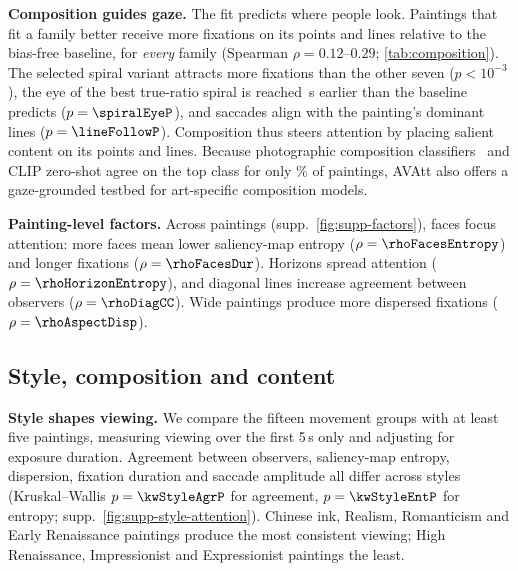 \documentclass[10pt,twocolumn,letterpaper]{article}
\newcommand{\avatt}{AVAtt}
\newcommand{\mypara}[1]{\vspace{2pt}\noindent\textbf{#1}\hspace{0.5em}}
\begin{document}
\mypara{Composition guides gaze.} The fit predicts where people look. Paintings that fit a family better receive more
fixations on its points and lines relative to the bias-free baseline, for \emph{every} family (Spearman
$\rho=0.12$--$0.29$; \cref{tab:composition}). The selected spiral variant attracts more fixations than the other seven
($p<10^{-3}$), the eye of the best true-ratio spiral is reached \spiralEyeGain\,s earlier than the baseline predicts
($p=\spiralEyeP$), and saccades align with the painting's dominant lines ($p=\lineFollowP$). Composition thus steers
attention by placing salient content on its points and lines. Because photographic composition
classifiers~\cite{hong2021cacnet,lee2018kupcp} and CLIP zero-shot agree on the top class for only \cacClipAgree\% of
paintings, \avatt{} also offers a gaze-grounded testbed for art-specific composition models.

\begin{table}[t]
  \centering
  \caption{Composition families. Var.: variants; Top / Bottom: fixation enrichment on the template (observed /
  baseline) for the best- and worst-fitting quarter of paintings; $\rho$: correlation between image-only fit and
  enrichment.}
  \label{tab:composition}
\end{table}

\mypara{Painting-level factors.} Across paintings (supp.\ \cref{fig:supp-factors}), faces focus attention: more faces
mean lower saliency-map entropy ($\rho=\rhoFacesEntropy$) and longer fixations ($\rho=\rhoFacesDur$). Horizons spread
attention ($\rho=\rhoHorizonEntropy$), and diagonal lines increase agreement between observers ($\rho=\rhoDiagCC$).
Wide paintings produce more dispersed fixations ($\rho=\rhoAspectDisp$).

\subsection{Style, composition and content}
\label{sec:style}

\mypara{Style shapes viewing.} We compare the fifteen movement groups with at least five paintings, measuring viewing
over the first 5\,s only and adjusting for exposure duration. Agreement between observers, saliency-map entropy,
dispersion, fixation duration and saccade amplitude all differ across styles (Kruskal--Wallis $p=\kwStyleAgrP$ for
agreement, $p=\kwStyleEntP$ for entropy; supp.\ \cref{fig:supp-style-attention}). Chinese ink, Realism, Romanticism and Early Renaissance paintings produce the
most consistent viewing; High Renaissance, Impressionist and Expressionist paintings the least.
\end{document}
